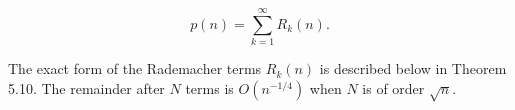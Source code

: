 $$p(n) = \sum_{k=1}^{\infty} R_k(n).$$

The exact form of the Rademacher terms $R_k(n)$ is described below in Theorem 5.10. The remainder after $N$ terms is $O(n^{-1/4})$ when $N$ is of order $\sqrt{n}$.
